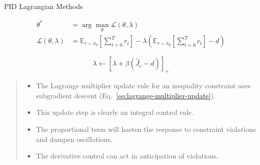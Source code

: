 \documentclass[8pt, aspectratio=169]{beamer} %
\begin{document}
\begin{frame}{\insertsubsectionhead}{PID Lagrangian Methods \cite{stooke2020responsive}}

  \begin{equation}
    \begin{aligned}
      \theta^* &= \arg\max_\theta \mathcal{L}(\theta, \lambda) \\
      \mathcal{L}(\theta, \lambda) &= \mathbb{E}_{\tau \sim \pi_\theta} \left[ \sum^T_{t = 0} r_t \right] - \lambda \left( \mathbb{E}_{\tau \sim \pi_\theta} \left[ \sum^T_{t = 0} c_t \right] - d \right)
    \end{aligned}
    \tag{3}
  \end{equation}

  \begin{equation}
    \lambda \leftarrow \left[ \lambda + \beta\left( \hat{J}_c - d \right) \right]_+
    \tag{4}
  \end{equation}

  \vspace{0.5cm}

  \begin{quote}
    \begin{itemize}
      \item The Lagrange multiplier update rule for an inequality constraint uses subgradient descent (Eq.~\ref{eq:lagrange-multiplier-update}).
      \item This update step is clearly an integral control rule.
      \item The proportional term will hasten the response to constraint violations and dampen oscillations.
      \item The derivative control can act in anticipation of violations.
    \end{itemize}
  \end{quote}
  
\end{frame}
\end{document}
